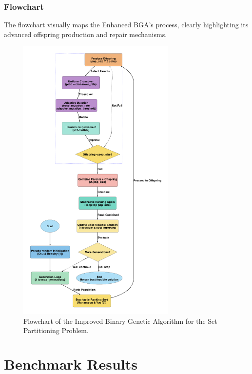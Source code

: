 \documentclass[12pt]{article}
\begin{document}
\subsubsection{Flowchart}
The flowchart visually maps the Enhanced BGA’s process, clearly highlighting its advanced offspring production and repair mechanisms.
\begin{figure}[htbp]
  \centering
  \includegraphics[width=0.70\textwidth]{images/improved_bga_flowchart.png}
  \caption{Flowchart of the Improved Binary Genetic Algorithm for the Set Partitioning Problem.}
  \label{fig:flowchart3}
\end{figure}

\newpage

\section{Benchmark Results}
\label{sec:results}
\end{document}
